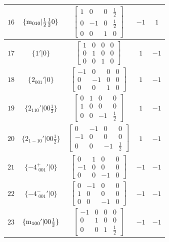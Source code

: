 \documentclass[fleqn,8pt]{jsarticle}
\begin{document}
\begin{longtable}{ccccc}
$ 16 $ & $ \{{\rm m}_{010}|\frac{1}{2} \frac{1}{2} 0\} $ & $ \begin{bmatrix} 1 & 0 & 0 & \frac{1}{2} \\ 0 & -1 & 0 & \frac{1}{2} \\ 0 & 0 & 1 & 0 \end{bmatrix} $ & $ -1 $ & $ 1 $ \\ \hline
$ 17 $ & $ \{1{}'|0\} $ & $ \begin{bmatrix} 1 & 0 & 0 & 0 \\ 0 & 1 & 0 & 0 \\ 0 & 0 & 1 & 0 \end{bmatrix} $ & $ 1 $ & $ -1 $ \\ \hline
$ 18 $ & $ \{2{}_{001}{}'|0\} $ & $ \begin{bmatrix} -1 & 0 & 0 & 0 \\ 0 & -1 & 0 & 0 \\ 0 & 0 & 1 & 0 \end{bmatrix} $ & $ 1 $ & $ -1 $ \\ \hline
$ 19 $ & $ \{2{}_{110}{}'|0 0 \frac{1}{2}\} $ & $ \begin{bmatrix} 0 & 1 & 0 & 0 \\ 1 & 0 & 0 & 0 \\ 0 & 0 & -1 & \frac{1}{2} \end{bmatrix} $ & $ 1 $ & $ -1 $ \\ \hline
$ 20 $ & $ \{2{}_{1-10}{}'|0 0 \frac{1}{2}\} $ & $ \begin{bmatrix} 0 & -1 & 0 & 0 \\ -1 & 0 & 0 & 0 \\ 0 & 0 & -1 & \frac{1}{2} \end{bmatrix} $ & $ 1 $ & $ -1 $ \\ \hline
$ 21 $ & $ \{-4^{+}_{\,\,001}{}'|0\} $ & $ \begin{bmatrix} 0 & 1 & 0 & 0 \\ -1 & 0 & 0 & 0 \\ 0 & 0 & -1 & 0 \end{bmatrix} $ & $ -1 $ & $ -1 $ \\ \hline
$ 22 $ & $ \{-4^{-}_{\,\,001}{}'|0\} $ & $ \begin{bmatrix} 0 & -1 & 0 & 0 \\ 1 & 0 & 0 & 0 \\ 0 & 0 & -1 & 0 \end{bmatrix} $ & $ -1 $ & $ -1 $ \\ \hline
$ 23 $ & $ \{{\rm m}_{100}{}'|0 0 \frac{1}{2}\} $ & $ \begin{bmatrix} -1 & 0 & 0 & 0 \\ 0 & 1 & 0 & 0 \\ 0 & 0 & 1 & \frac{1}{2} \end{bmatrix} $ & $ -1 $ & $ -1 $ \\ \hline

\end{longtable}
\end{document}
